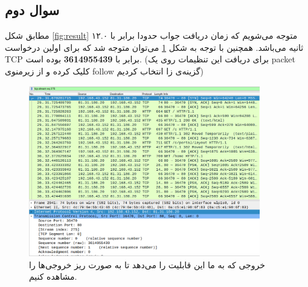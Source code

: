 \documentclass{article}
\begin{document}
\subsection{سوال دوم}
مطابق شکل \ref{fig:result} متوجه می‌شویم که زمان دریافت جواب حدودا برابر با ۱۲.۰ ثانیه می‌باشد. همچنین با توجه به شکل \ref{fig:tcpseq} می‌توان متوجه شد که 
 برای اولین درخواست TCP برابر با \textbf{3614955439} بوده است. (برای دریافت این تنظیمات روی یک packet کلیک کرده و از زیرمنوی follow گزینه‌ی
   زا انتخاب کردیم)
\begin{figure}[h!]
	\centering
	\includegraphics[width=0.9\textwidth]{src/tcpseq.png}
	\caption{
خروجی
  که به ما این قابلیت را می‌دهد تا به صورت ریز خروجی‌ها را مشاهده کنیم.	
}
	\label{fig:tcpseq}
\end{figure}
\end{document}
